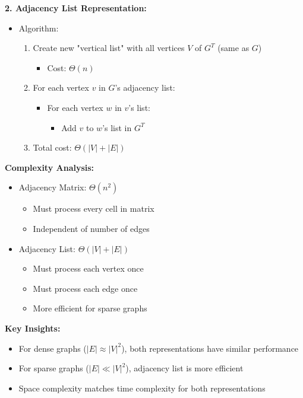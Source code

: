 \textbf{2. Adjacency List Representation:}
\begin{itemize}[noitemsep]
    \item Algorithm:
        \begin{enumerate}[noitemsep]
            \item Create new "vertical list" with all vertices $V$ of $G^T$ (same as $G$)
                \begin{itemize}[noitemsep]
                    \item Cost: $\Theta(n)$
                \end{itemize}
            \item For each vertex $v$ in $G$'s adjacency list:
                \begin{itemize}[noitemsep]
                    \item For each vertex $w$ in $v$'s list:
                        \begin{itemize}[noitemsep]
                            \item Add $v$ to $w$'s list in $G^T$
                        \end{itemize}
                \end{itemize}
            \item Total cost: $\Theta(|V| + |E|)$
        \end{enumerate}
\end{itemize}

\textbf{Complexity Analysis:}
\begin{itemize}[noitemsep]
    \item Adjacency Matrix: $\Theta(n^2)$
        \begin{itemize}[noitemsep]
            \item Must process every cell in matrix
            \item Independent of number of edges
        \end{itemize}
    \item Adjacency List: $\Theta(|V| + |E|)$
        \begin{itemize}[noitemsep]
            \item Must process each vertex once
            \item Must process each edge once
            \item More efficient for sparse graphs
        \end{itemize}
\end{itemize}

\textbf{Key Insights:}
\begin{itemize}[noitemsep]
    \item For dense graphs ($|E| \approx |V|^2$), both representations have similar performance
    \item For sparse graphs ($|E| \ll |V|^2$), adjacency list is more efficient
    \item Space complexity matches time complexity for both representations
\end{itemize}

